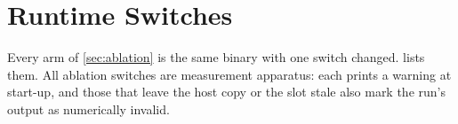 
\section{Runtime Switches}\label{sec:switches}

Every arm of \cref{sec:ablation} is the same binary with one switch changed.
 lists them. All ablation switches are measurement
apparatus: each prints a warning at start-up, and those that leave the host
copy or the slot stale also mark the run's output as numerically invalid.

